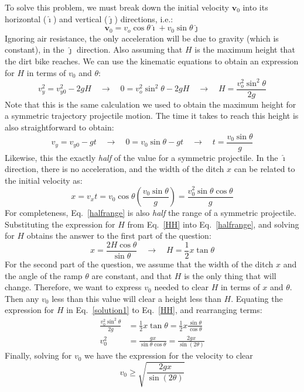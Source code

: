 \documentclass[11pt]{article}
\newcommand{\mb}[1]{\mathbf{#1}}
\newcommand{\iii}{\bm{\hat{\imath}}}
\newcommand{\jjj}{\bm{\hat{\jmath}}}
\begin{document}
To solve this problem, we must break down the initial velocity $\mb{v}_0$ into
its horizontal ($\iii$) and vertical ($\jjj$) directions, i.e.:
\begin{displaymath}
  \mb{v}_0=v_o\cos\theta\iii+v_0\sin\theta\jjj
\end{displaymath}
Ignoring air resistance, the only acceleration will be due to gravity (which is
constant), in the $\jjj$ direction. Also assuming that $H$ is the maximum
height that the dirt bike reaches. We can use the kinematic equations to obtain
an expression for $H$ in terms of $v_0$ and $\theta$:
\begin{equation}
  v_y^2=v_{y0}^2-2gH\quad\longrightarrow\quad
  0=v_o^2\sin^2\theta-2gH\quad\longrightarrow\quad
  \boxed{H=\frac{v_o^2\sin^2\theta}{2g}}
  \label{HH}
\end{equation}
Note that this is the same calculation we used to obtain the maximum height
for a symmetric trajectory projectile motion. The time it takes to reach this
height is also straightforward to obtain:
\begin{equation}
  v_y=v_{y0}-gt\quad\longrightarrow\quad
  0=v_0\sin\theta-gt\quad\longrightarrow\quad
  \boxed{t=\frac{v_0\sin\theta}{g}}
\end{equation}
Likewise, this the exactly \emph{half} of the value for a symmetric projectile.
In the $\iii$ direction, there is no acceleration, and the width of the ditch
$x$ can be related to the initial velocity as:
\begin{equation}
  x=v_xt=v_0\cos\theta\left(\frac{v_0\sin\theta}{g}\right)
  =\boxed{\frac{v_0^2\sin\theta\cos\theta}{g}}
  \label{halfrange}
\end{equation}
For completeness, Eq.~\ref{halfrange} is also \emph{half} the range of a
symmetric projectile. Substituting the expression for $H$ from Eq.~\ref{HH}
into Eq.~\ref{halfrange}, and solving for $H$ obtains the answer to the first
part of the question:
\begin{equation}
  x=\frac{2H\cos\theta}{\sin\theta}
  \quad\longrightarrow\quad
  \boxed{H=\frac12x\tan\theta}
  \label{solution1}
\end{equation}
For the second part of the question, we assume that the width of the ditch
$x$ and the angle of the ramp $\theta$ are constant, and that $H$ is the only
thing that will change. Therefore, we want to express $v_0$ needed to clear $H$
in terms of $x$ and $\theta$. Then any $v_0$ less than this value will clear a
height less than $H$. Equating the expression for $H$ in Eq.~\ref{solution1} to
Eq.~\ref{HH}, and rearranging terms:
\begin{align}
  \frac{v_0^2\sin^2\theta}{2g}&=\frac12x\tan\theta
  =\frac12 x\frac{\sin\theta}{\cos\theta}\\
  v_0^2&=\frac{gx}{\sin\theta\cos\theta}=\frac{2gx}{\sin(2\theta)}
\end{align}
Finally, solving for $v_0$ we have the expression for the velocity to clear
\begin{equation}
  \boxed{v_0\geq\sqrt{\frac{2gx}{\sin(2\theta)}}}
\end{equation}
\end{document}
